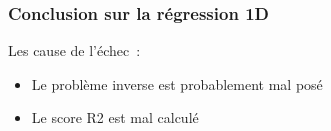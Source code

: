 \begin{frame}
    \frametitle{Conclusion sur la régression 1D}
Les cause de l'échec :
\pause
\begin{itemize}[<+>]
    \item Le problème inverse est probablement mal posé  %
    \item Le score R2 est mal calculé %
\end{itemize}
\end{frame}


% 
